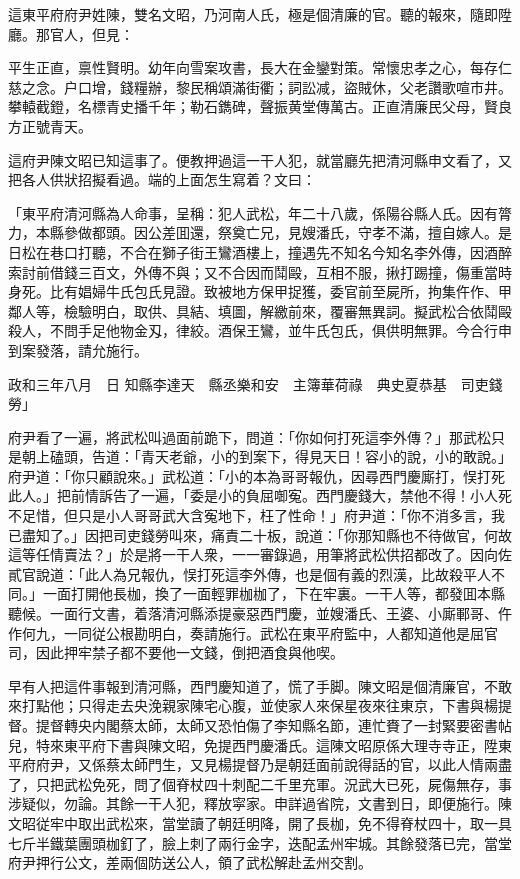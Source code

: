 這東平府府尹姓陳，雙名文昭，乃河南人氏，極是個清廉的官。聽的報來，隨即陞廳。那官人，但見：
\begin{myquote}
平生正直，禀性賢明。幼年向雪案攻書，長大在金鑾對策。常懷忠孝之心，每存仁慈之念。户口增，錢糧辦，黎民稱頌滿街衢；詞訟减，盜賊休，父老讚歌喧市井。攀轅截鐙，名標青史播千年；勒石鐫碑，聲振黄堂傳萬古。正直清廉民父母，賢良方正號青天。
\end{myquote}

這府尹陳文昭已知這事了。便教押過這一干人犯，就當廳先把清河縣申文看了，又把各人供狀招擬看過。端的上面怎生寫着？文曰：
\begin{myquote}[\markfont]
「東平府清河縣為人命事，呈稱：犯人武松，年二十八歲，係陽谷縣人氏。因有膂力，本縣參做都頭。因公差囬還，祭奠亡兄，見嫂潘氏，守孝不滿，擅自嫁人。是日松在巷口打聽，不合在獅子街王鸞酒樓上，撞遇先不知名今知名李外傳，因酒醉索討前借錢三百文，外傳不與；又不合因而鬦毆，互相不服，揪打踢撞，傷重當時身死。比有娼婦牛氏包氏見證。致被地方保甲捉獲，委官前至屍所，拘集仵作、甲鄰人等，檢驗明白，取供、具結、填圖，解繳前來，覆審無異詞。擬武松合依鬦毆殺人，不問手足他物金刄，律絞。酒保王鸞，並牛氏包氏，俱供明無罪。今合行申到案發落，請允施行。

政和三年八月　日
知縣李達天　縣丞樂和安　主簿華荷祿　典史夏恭基　司吏錢勞」
\end{myquote}

府尹看了一遍，將武松叫過面前跪下，問道：「你如何打死這李外傳？」那武松只是朝上磕頭，告道：「青天老爺，小的到案下，得見天日！容小的說，小的敢說。」府尹道：「你只顧說來。」武松道：「小的本為哥哥報仇，因尋西門慶廝打，悮打死此人。」把前情訴告了一遍，「委是小的負屈啣寃。西門慶錢大，禁他不得！小人死不足惜，但只是小人哥哥武大含寃地下，枉了性命！」府尹道：「你不消多言，我已盡知了。」因把司吏錢勞叫來，痛責二十板，說道：「你那知縣也不待做官，何故這等任情賣法？」於是將一干人衆，一一審錄過，用筆將武松供招都改了。因向佐貳官說道：「此人為兄報仇，悮打死這李外傳，也是個有義的烈漢，比故殺平人不同。」一面打開他長枷，換了一面輕罪枷枷了，下在牢裏。一干人等，都發囬本縣聽候。一面行文書，着落清河縣添提豪惡西門慶，並嫂潘氏、王婆、小廝鄆哥、仵作何九，一同従公根勘明白，奏請施行。武松在東平府監中，人都知道他是屈官司，因此押牢禁子都不要他一文錢，倒把酒食與他喫。

早有人把這件事報到清河縣，西門慶知道了，慌了手脚。陳文昭是個清廉官，不敢來打點他；只得走去央浼親家陳宅心腹，並使家人來保星夜來往東京，下書與楊提督。提督轉央内閣蔡太師，太師又恐怕傷了李知縣名節，連忙賚了一封緊要密書帖兒，特來東平府下書與陳文昭，免提西門慶潘氏。這陳文昭原係大理寺寺正，陞東平府府尹，又係蔡太師門生，又見楊提督乃是朝廷面前說得話的官，以此人情兩盡了，只把武松免死，問了個脊杖四十刺配二千里充軍。況武大已死，屍傷無存，事涉疑似，勿論。其餘一干人犯，釋放寜家。申詳過省院，文書到日，即便施行。陳文昭従牢中取出武松來，當堂讀了朝廷明降，開了長枷，免不得脊杖四十，取一具七斤半鐵葉團頭枷釘了，臉上刺了兩行金字，迭配孟州牢城。其餘發落已完，當堂府尹押行公文，差兩個防送公人，領了武松解赴孟州交割。

